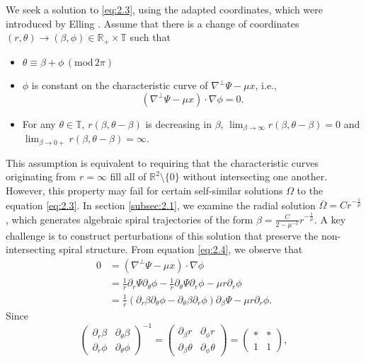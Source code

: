 \documentclass[11pt]{article}
\theoremstyle{definition}
\theoremstyle{remark}
\numberwithin{equation}{section}
\newcommand{\mbb}{\mathbb}
\renewcommand{\bar}{\overline}
\newcommand{\R}{\mbb{R}}
\newcommand{\del}{\partial}
\newcommand{\grad}{\nabla}
\begin{document}
We seek a solution to \eqref{eq:2.3}, using the adapted coordinates, which were introduced by Elling \cite{Ell13, Ell16}. Assume that there is a change of coordinates $(r,\theta) \to (\beta,\phi) \in \R_+ \times \mbb{T}$ such that
\vspace{-.5em}\begin{itemize}
	\item $\theta \equiv \beta + \phi \,(\text{mod} \,2\pi)$
	\item $\phi$ is constant on the characteristic curve of $\grad^\perp \Psi - \mu x$, i.e.,
	\begin{equation} \label{eq:2.4} (\grad^\perp \Psi - \mu x) \cdot \grad \phi = 0. \end{equation}
	\item For any $\theta\in \mbb{T}$, $r(\beta,\theta - \beta)$ is decreasing in $\beta$, $\displaystyle \lim_{\beta \to \infty} r(\beta,\theta - \beta) = 0$ and $\displaystyle \lim_{\beta \to 0+} r(\beta,\theta - \beta) = \infty$.
\end{itemize}
This assumption is equivalent to requiring that the characteristic curves originating from $r=\infty$ fill all of $\R^2\setminus\{0\}$ without intersecting one another. However, this property may fail for certain self-similar solutions $\Omega$ to the equation \eqref{eq:2.3}. In section \ref{subsec:2.1}, we examine the radial solution $\bar{\Omega} = Cr^{-\frac{1}{\mu}}$, which generates algebraic spiral trajectories of the form $\beta = \frac{C}{2 - \mu^{-1}}r^{-\frac{1}{\mu}}$. A key challenge is to construct perturbations of this solution that preserve the non-intersecting spiral structure. From equation \eqref{eq:2.4}, we observe that
\begin{align*}
0 &= (\grad^\perp \Psi - \mu x) \cdot \grad \phi \\
&= \frac{1}{r} \del_r \Psi \del_\theta \phi - \frac{1}{r} \del_\theta \Psi \del_r \phi - \mu r \del_r \phi \\
&= \frac{1}{r} (\del_r \beta \del_\theta \phi - \del_\theta \beta \del_r \phi) \del_\beta \Psi - \mu r \del_r \phi.
\end{align*}
Since
\[\begin{pmatrix} \del_r \beta & \del_\theta \beta \\ \del_r \phi & \del_\theta \phi \end{pmatrix}^{-1} = \begin{pmatrix} \del_\beta r & \del_\phi r \\ \del_\beta \theta & \del_\phi \theta \end{pmatrix} = \begin{pmatrix} * & * \\ 1 & 1 \end{pmatrix},\]
\end{document}

